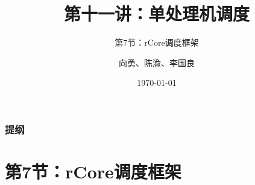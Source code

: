 



\title[第10讲]{第十一讲：单处理机调度} %
\subtitle{第7节：rCore调度框架}
\author{向勇、陈渝、李国良} %
\date{\today} %



\begin{frame}
\titlepage %
\end{frame}
\begin{frame}
\frametitle{提纲} %
\tableofcontents %
\end{frame}
\section{第7节：rCore调度框架}%
